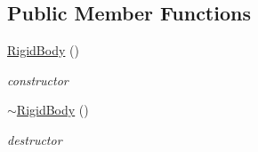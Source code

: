 \subsection*{Public Member Functions}
\begin{DoxyCompactItemize}
\item 
\hypertarget{classContent_1_1Actor_1_1Renderer_1_1RigidBody_a49a24e39b85a2196138e0137d2b10ae3}{
\hyperlink{classContent_1_1Actor_1_1Renderer_1_1RigidBody_a49a24e39b85a2196138e0137d2b10ae3}{RigidBody} ()}
\label{classContent_1_1Actor_1_1Renderer_1_1RigidBody_a49a24e39b85a2196138e0137d2b10ae3}

\begin{DoxyCompactList}\small\item\em constructor \item\end{DoxyCompactList}\item 
\hypertarget{classContent_1_1Actor_1_1Renderer_1_1RigidBody_a986e768dd270b888e5ca85a98bd2a117}{
\hyperlink{classContent_1_1Actor_1_1Renderer_1_1RigidBody_a986e768dd270b888e5ca85a98bd2a117}{$\sim$RigidBody} ()}
\label{classContent_1_1Actor_1_1Renderer_1_1RigidBody_a986e768dd270b888e5ca85a98bd2a117}

\begin{DoxyCompactList}\small\item\em destructor \item\end{DoxyCompactList}\end{DoxyCompactItemize}
